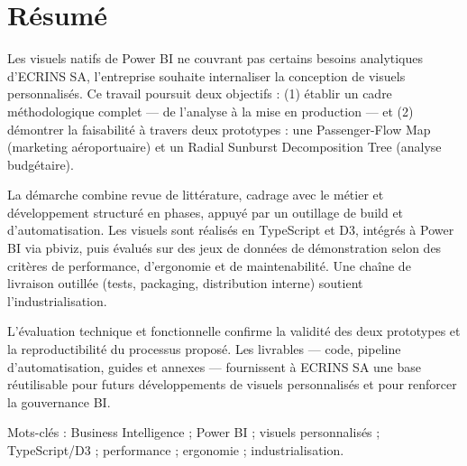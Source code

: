 \chapter*{Résumé}
\setlength{\parindent}{0pt}

Les visuels natifs de Power BI ne couvrant pas certains besoins analytiques d’ECRINS SA, l’entreprise souhaite internaliser la conception de visuels personnalisés. Ce travail poursuit deux objectifs : (1) établir un cadre méthodologique complet — de l’analyse à la mise en production — et (2) démontrer la faisabilité à travers deux prototypes : une Passenger-Flow Map (marketing aéroportuaire) et un Radial Sunburst Decomposition Tree  (analyse budgétaire).

La démarche combine revue de littérature, cadrage avec le métier et développement structuré en phases, appuyé par un outillage de build et d’automatisation. Les visuels sont réalisés en TypeScript et D3, intégrés à Power BI via pbiviz, puis évalués sur des jeux de données de démonstration selon des critères de performance, d’ergonomie et de maintenabilité. Une chaîne de livraison outillée (tests, packaging, distribution interne) soutient l’industrialisation.

L’évaluation technique et fonctionnelle confirme la validité des deux prototypes et la reproductibilité du processus proposé. Les livrables — code, pipeline d’automatisation, guides et annexes — fournissent à ECRINS SA une base réutilisable pour futurs développements de visuels personnalisés et pour renforcer la gouvernance BI.

\vspace{0.8em}
Mots-clés : Business Intelligence ; Power BI ; visuels personnalisés ; TypeScript/D3 ; performance ; ergonomie ; industrialisation.
